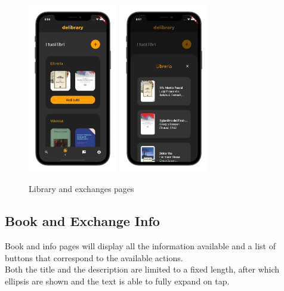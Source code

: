 \begin{figure}[H]
{            \includegraphics[width=0.35\textwidth]{screens/mock/smartphone/library.png}
            \includegraphics[width=0.35\textwidth]{screens/mock/smartphone/library-expanded.png}
      }
      \caption{Library and exchanges pages}
\end{figure}

\subsection{Book and Exchange Info}
Book and info pages will display all the information available and a list of buttons that correspond to the available actions.\\
Both the title and the description are limited to a fixed length, after which ellipsis are shown and the text is able to fully expand on tap.

